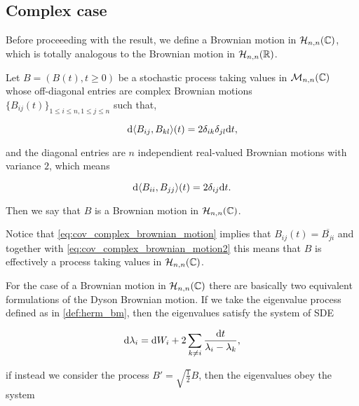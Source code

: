 \subsection{Complex case}

Before proceeeding with the result, we define a Brownian motion in $\mathcal H_{n,n}(\mathbb C)$, which is totally analogous to the Brownian motion in $\mathcal H_{n,n}(\mathbb R)$.

\begin{definition} \label{def:herm_bm}
    Let $B = (B(t), t \ge 0)$ be a stochastic process taking values in $\mathcal M_{n,n}(\mathbb C)$ whose off-diagonal entries are complex Brownian motions $\{B_{ij}(t)\}_{1 \le i \le n, 1 \le j \le n}$ such that,

    \begin{equation}
        \mathrm d \langle B_{ij}, B_{kl} \rangle(t) = 2\delta_{ik}\delta_{jl} \mathrm d t, \label{eq:cov_complex_brownian_motion}
    \end{equation}

    \noindent and the diagonal entries are $n$ independient real-valued Brownian motions with variance $2$, which means

    \begin{equation}
        \mathrm d \langle B_{ii}, B_{jj} \rangle(t) = 2\delta_{ij} \mathrm d t.\label{eq:cov_complex_brownian_motion2}
    \end{equation}
    
    Then we say that $B$ is a Brownian motion in $\mathcal H_{n,n}(\mathbb C)$.
\end{definition}

Notice that \eqref{eq:cov_complex_brownian_motion} implies that $B_{ij}(t) = \overline{B_{ji}}$ and together with \eqref{eq:cov_complex_brownian_motion2} this means that $B$ is effectively a process taking values in $\mathcal H_{n,n}(\mathbb C)$.

For the case of a Brownian motion in $\mathcal H_{n,n}(\mathbb C)$ there are basically two equivalent formulations of the Dyson Brownian motion. If we take the eigenvalue process defined as in \ref{def:herm_bm}, then the eigenvalues satisfy the system of SDE

\begin{equation*}
        \mathrm d \lambda_i = \mathrm d W_i + 2\sum_{k\neq i} \frac{\mathrm d t}{\lambda_i - \lambda_k},
\end{equation*}

\noindent if instead we consider the process $B' = \sqrt{\frac12}B$, then the eigenvalues obey the system

